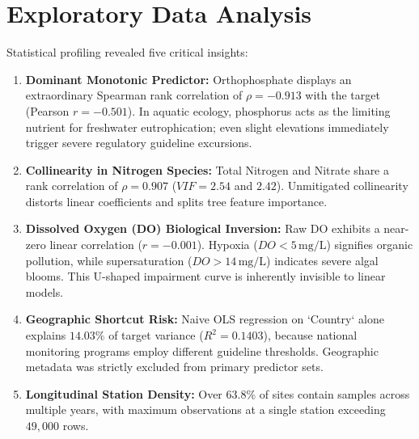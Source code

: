 \documentclass[journal,10pt,twocolumn]{IEEEtran}
\begin{document}
\section{Exploratory Data Analysis}
Statistical profiling revealed five critical insights:
\begin{enumerate}
    \item \textbf{Dominant Monotonic Predictor:} Orthophosphate displays an extraordinary Spearman rank correlation of $\rho = -0.913$ with the target (Pearson $r = -0.501$). In aquatic ecology, phosphorus acts as the limiting nutrient for freshwater eutrophication; even slight elevations immediately trigger severe regulatory guideline excursions.
    \item \textbf{Collinearity in Nitrogen Species:} Total Nitrogen and Nitrate share a rank correlation of $\rho = 0.907$ ($VIF = 2.54$ and $2.42$). Unmitigated collinearity distorts linear coefficients and splits tree feature importance.
    \item \textbf{Dissolved Oxygen (DO) Biological Inversion:} Raw DO exhibits a near-zero linear correlation ($r = -0.001$). Hypoxia ($DO < 5\,\text{mg/L}$) signifies organic pollution, while supersaturation ($DO > 14\,\text{mg/L}$) indicates severe algal blooms. This U-shaped impairment curve is inherently invisible to linear models.
    \item \textbf{Geographic Shortcut Risk:} Naive OLS regression on `Country` alone explains $14.03\%$ of target variance ($R^2 = 0.1403$), because national monitoring programs employ different guideline thresholds. Geographic metadata was strictly excluded from primary predictor sets.
    \item \textbf{Longitudinal Station Density:} Over $63.8\%$ of sites contain samples across multiple years, with maximum observations at a single station exceeding $49,000$ rows.
\end{enumerate}
\end{document}
